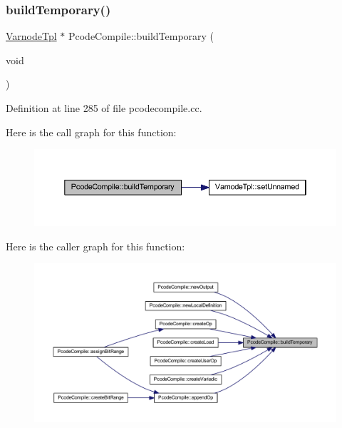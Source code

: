 \subsubsection{\texorpdfstring{buildTemporary()}{buildTemporary()}}
{\footnotesize\ttfamily \mbox{\hyperlink{class_varnode_tpl}{Varnode\+Tpl}} $\ast$ Pcode\+Compile\+::build\+Temporary (\begin{DoxyParamCaption}\item[{void}]{ }\end{DoxyParamCaption})}



Definition at line 285 of file pcodecompile.\+cc.

Here is the call graph for this function\+:
\nopagebreak
\begin{figure}[H]
\begin{center}
\leavevmode
\includegraphics[width=350pt]{class_pcode_compile_a376e7dc6da993a0a5ebc0ea372add1af_cgraph}
\end{center}
\end{figure}
Here is the caller graph for this function\+:
\nopagebreak
\begin{figure}[H]
\begin{center}
\leavevmode
\includegraphics[width=350pt]{class_pcode_compile_a376e7dc6da993a0a5ebc0ea372add1af_icgraph}
\end{center}
\end{figure}
\mbox{\label{class_pcode_compile_ab334954dd18986dfe6623b905f540c13}} 
